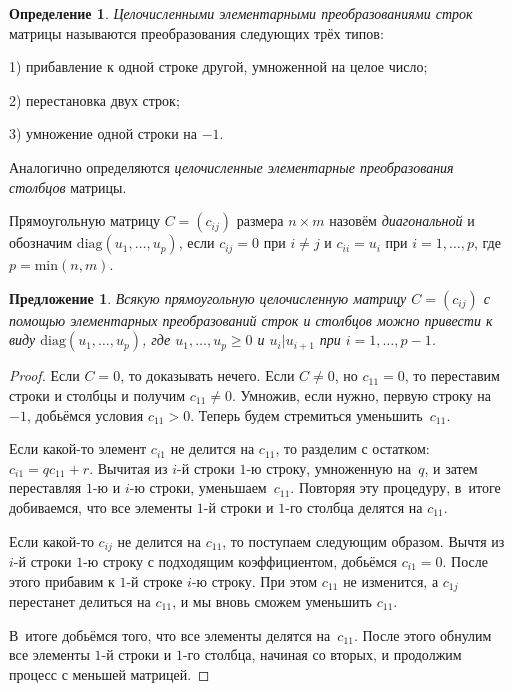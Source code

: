 \documentclass[a4paper, 12pt]{article}
\newtheorem{proposition}{Предложение}
\theoremstyle{definition}
\newtheorem{definition}{Определение}
\theoremstyle{remark}
\begin{document}
\begin{definition}
{\it Целочисленными элементарными преобразованиями строк} матрицы
называются преобразования следующих трёх типов:

1) прибавление к одной строке другой, умноженной на целое число;

2) перестановка двух строк;

3) умножение одной строки на $-1$.

Аналогично определяются {\it целочисленные элементарные
преобразования столбцов} матрицы.
\end{definition}

Прямоугольную матрицу $C=(c_{ij})$ размера $n\times m$ назовём {\it
диагональной} и обозначим $\text{diag}(u_1,\ldots,u_p)$, если
$c_{ij}=0$ при $i\ne j$ и $c_{ii}=u_i$ при $i=1,\ldots,p$, где
$p=\text{min}(n,m)$.

\begin{proposition} \label{palg}
Всякую прямоугольную целочисленную матрицу $C=(c_{ij})$ с помощью
элементарных преобразований строк и столбцов можно привести к виду
$\text{diag}(u_1,\ldots,u_p)$, где $u_1,\ldots,u_p \geqslant 0$ и
$u_i|u_{i+1}$ при $i=1,\ldots,p-1$.
\end{proposition}

\begin{proof}
Если $C=0$, то доказывать нечего. Если $C\ne 0$, но $c_{11}=0$, то
переставим строки и столбцы и получим $c_{11}\ne 0$. Умножив, если
нужно, первую строку на $-1$, добьёмся условия $c_{11}>0$. Теперь
будем стремиться уменьшить~$c_{11}$.

Если какой-то элемент $c_{i1}$ не делится на $c_{11}$, то разделим с
остатком: $c_{i1}=qc_{11}+r$. Вычитая из $i$-й строки $1$-ю строку,
умноженную на~$q$, и затем переставляя $1$-ю и $i$-ю строки,
уменьшаем~$c_{11}$. Повторяя эту процедуру, в~итоге добиваемся, что
все элементы $1$-й строки и $1$-го столбца делятся на $c_{11}$.

Если какой-то $c_{ij}$ не делится на $c_{11}$, то поступаем
следующим образом. Вычтя из $i$-й строки $1$-ю строку с подходящим
коэффициентом, добьёмся $c_{i1}=0$. После этого прибавим к $1$-й
строке $i$-ю строку. При этом $c_{11}$ не изменится, а $c_{1j}$
перестанет делиться на $c_{11}$, и мы вновь сможем уменьшить
$c_{11}$.

В~итоге добьёмся того, что все элементы делятся на~$c_{11}$. После
этого обнулим все элементы $1$-й строки и $1$-го столбца, начиная со
вторых, и продолжим процесс с меньшей матрицей.
\end{proof}
\end{document}
